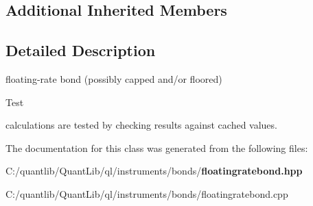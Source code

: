 \subsection*{Additional Inherited Members}


\subsection{Detailed Description}
floating-\/rate bond (possibly capped and/or floored) 

\begin{DoxyRefDesc}{Test}
\item[{\bf Test}]calculations are tested by checking results against cached values. \end{DoxyRefDesc}


The documentation for this class was generated from the following files\+:\begin{DoxyCompactItemize}
\item 
C\+:/quantlib/\+Quant\+Lib/ql/instruments/bonds/{\bf floatingratebond.\+hpp}\item 
C\+:/quantlib/\+Quant\+Lib/ql/instruments/bonds/floatingratebond.\+cpp\end{DoxyCompactItemize}
